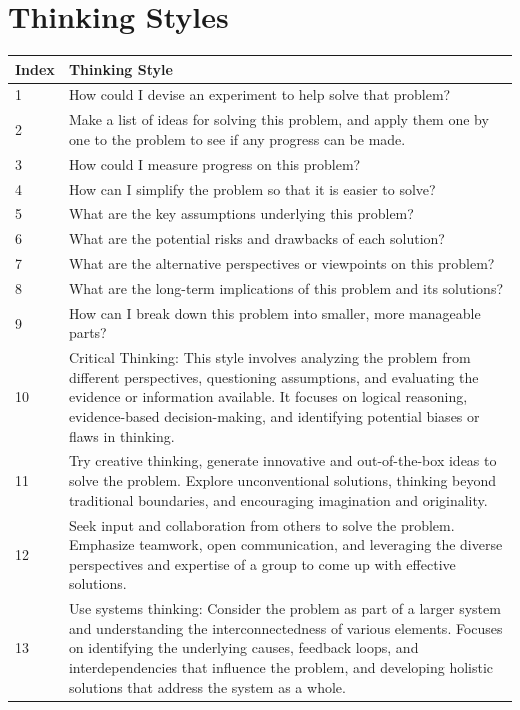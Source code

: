 \documentclass{article} %
\begin{document}
\section{Thinking Styles} 
\label{appendix:thinking}
\begin{longtable}{p{1cm}p{10cm}}
\toprule
\textbf{Index} & \textbf{Thinking Style} \\
\midrule
1 & How could I devise an experiment to help solve that problem? \\
2 & Make a list of ideas for solving this problem, and apply them one by one to the problem to see if any progress can be made. \\
3 & How could I measure progress on this problem? \\
4 & How can I simplify the problem so that it is easier to solve? \\
5 & What are the key assumptions underlying this problem? \\
6 & What are the potential risks and drawbacks of each solution? \\
7 & What are the alternative perspectives or viewpoints on this problem? \\
8 & What are the long-term implications of this problem and its solutions? \\
9 & How can I break down this problem into smaller, more manageable parts? \\
10 & Critical Thinking: This style involves analyzing the problem from different perspectives, questioning assumptions, and evaluating the evidence or information available. It focuses on logical reasoning, evidence-based decision-making, and identifying potential biases or flaws in thinking. \\
11 &  Try creative thinking, generate innovative and out-of-the-box ideas to solve the problem. Explore unconventional solutions, thinking beyond traditional boundaries, and encouraging imagination and originality.\\
12 & Seek input and collaboration from others to solve the problem. Emphasize teamwork, open communication, and leveraging the diverse perspectives and expertise of a group to come up with effective solutions.\\
13 & Use systems thinking: Consider the problem as part of a larger system and understanding the interconnectedness of various elements. Focuses on identifying the underlying causes, feedback loops, and interdependencies that influence the problem, and developing holistic solutions that address the system as a whole.\\

\end{longtable}
\end{document}
